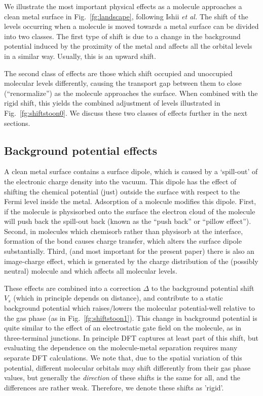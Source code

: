 \documentclass[aip,jcp,a4paper,reprint,floatfix,superscriptaddress]{revtex4-1}
\newcommand{\etal}{\emph{et al.}\xspace}
\begin{document}
We illustrate the most important physical effects as a molecule approaches a clean metal surface in Fig.~\ref{fg:landscape}, following Ishii \etal\cite{Ishii2000} 
The shift of the levels occurring when a molecule is moved towards a metal surface can be divided into two classes. The first type of shift is due to a change 
in the background potential induced by the proximity of the metal and affects all the orbital levels in a similar way. Usually, this is an upward shift. 

The second class of effects are those which shift occupied and unoccupied molecular levels differently, causing the transport gap between them to close (``renormalize'') as the molecule approaches the surface. When combined with the rigid shift, this yields the combined adjustment of levels illustrated in Fig.~\ref{fg:shiftstoon0}. We discuss these two classes of effects further in the next sections.

\subsection{Background potential effects}

A clean metal surface contains a surface dipole, which is caused by a `spill-out' of the electronic charge density into the vacuum. This dipole has the effect of shifting the chemical potential (just)
outside the surface with respect to the Fermi level inside the metal. Adsorption of a molecule modifies this
dipole.\cite{Seki1997,Ishii1999,Ishii2000,Vazquez2004a,Vazquez2004b} First, if the molecule is physisorbed onto the surface the electron cloud of the molecule will push back the spill-out back (known as the ``push back'' or ``pillow effect'').\cite{Vazquez2007,Flores2009} 
Second, in molecules which chemisorb rather than physisorb at the interface, formation of the bond causes charge transfer, which alters the surface dipole substantially. Third, 
(and most important for the present paper) there is also an image-charge effect, which is generated by the charge distribution of the (possibly neutral) molecule and which  affects all molecular levels.

These effects are combined into a correction $\Delta$ to the background potential shift $V_s$ (which in principle depends on distance), and contribute to a static background potential which raises/lowers the molecular potential-well relative to the gas phase (as in Fig.~\ref{fg:shiftstoon1}). 
This change in background potential is quite similar to the effect of an electrostatic gate field on the molecule, as in three-terminal junctions. 
In principle DFT captures at least part of this shift, but evaluating the dependence on the molecule-metal separation requires many separate DFT calculations. We note that, due to the spatial variation of this potential, different molecular orbitals may shift differently from their 
gas phase values, but 
generally the \emph{direction} of these shifts is the same for all, and the differences are rather weak. Therefore, we denote these shifts as 'rigid'.  
 
\end{document}
